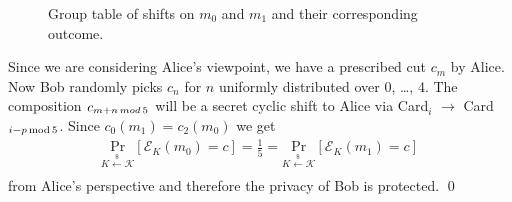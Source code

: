 \documentclass[12pt]{article}
\theoremstyle{remark}
\begin{document}
\begin{figure}[H]
\begin{minipage}{.65\linewidth}
\end{minipage}
\caption{Group table of shifts on $m_0$ and $m_1$ and their corresponding outcome.}
\end{figure}
Since we are considering Alice's viewpoint, we have a prescribed cut $c_m$ by Alice. Now Bob randomly picks $c_n$ for $n$ uniformly distributed over 0, \dots, 4. The composition $c_{m + n \hspace{.05cm} mod \hspace{.05cm} 5}$ will be a secret cyclic shift to Alice via Card$_i$ $\rightarrow$ Card$_{i - p \hspace{.05cm} \text{mod} \hspace{.05cm} 5}$. Since $c_0(m_1) = c_2(m_0)$ we get
\begin{align}
\underset{K \xleftarrow[]{\$} \mathcal{K}}{\text{Pr}}[\mathcal{E}_K(m_0) = c] = \frac{1}{5} =
\underset{K \xleftarrow[]{\$} \mathcal{K}}{\text{Pr}}[\mathcal{E}_K(m_1) = c]
\end{align}
from Alice's perspective and therefore the privacy of Bob is protected.
\qed
\end{document}
